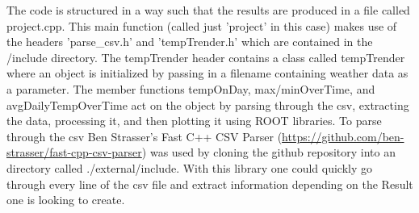 The code is structured in a way such that the results are produced in a file called project.cpp. This main function (called just 'project' in this case) makes use of the headers 'parse\_csv.h' and 'tempTrender.h' which are contained in the /include directory. The tempTrender header contains a class called tempTrender where an object is initialized by passing in a filename containing weather data as a parameter. The member functions tempOnDay, max/minOverTime, and avgDailyTempOverTime act on the object by parsing through the csv, extracting the data, processing it, and then plotting it using ROOT libraries. To parse through the csv Ben Strasser's Fast C++ CSV Parser (\url{https://github.com/ben-strasser/fast-cpp-csv-parser}) was used by cloning the github repository into an directory called ./external/include. With this library one could quickly go through every line of the csv file and extract information depending on the Result one is looking to create. 